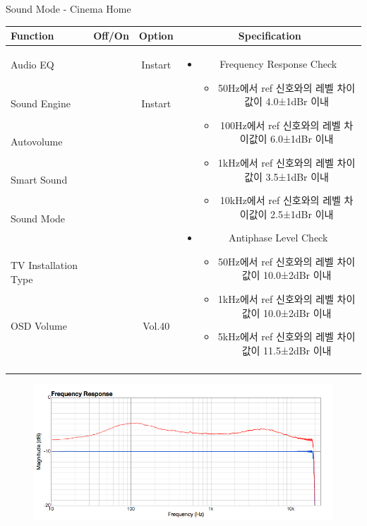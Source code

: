 \begin{frame}[t]{Sound Mode - Cinema Home}
\begin{tiny}
\begin{tabular}{@{}lccc@{}}
\toprule
Function & Off/On & Option & Specification \\
\midrule
Audio EQ & \color{black}{Off} & Instart &
\multirow{10}{60mm}{
\begin{itemize}
\item Frequency Response Check
	\begin{itemize}
	\item 50Hz에서 ref 신호와의 레벨 차이값이 4.0±1dBr 이내
	\item 100Hz에서 ref 신호와의 레벨 차이값이 6.0±1dBr 이내
	\item 1kHz에서 ref 신호와의 레벨 차이값이 3.5±1dBr 이내
	\item 10kHz에서 ref 신호와의 레벨 차이값이 2.5±1dBr 이내
	\end{itemize}
\item Antiphase Level Check
	\begin{itemize}
	\item 50Hz에서 ref 신호와의 레벨 차이값이 10.0±2dBr 이내
	\item 1kHz에서 ref 신호와의 레벨 차이값이 10.0±2dBr 이내
	\item 5kHz에서 ref 신호와의 레벨 차이값이 11.5±2dBr 이내
	\end{itemize}
\end{itemize}
} \\
Sound Engine & \color{blue}{On} & Instart & \\
Autovolume & \color{black}{Off} & & \\
Smart Sound & \color{black}{Off} & & \\
Sound Mode & \color{blue}{On} & \color{blue}{Cinema} & \\
TV Installation Type & \color{blue}{On} & \color{black}{Standtype1} & \\
OSD Volume & \color{blue}{On} & Vol.40 & \\
& & & \\
& & & \\
& & & \\
& & & \\
\midrule
\end{tabular}
\end{tiny}

\begin{figure}[b]
\includegraphics[height=0.4\textwidth]{figures/cinema.png}
\end{figure}

\end{frame}